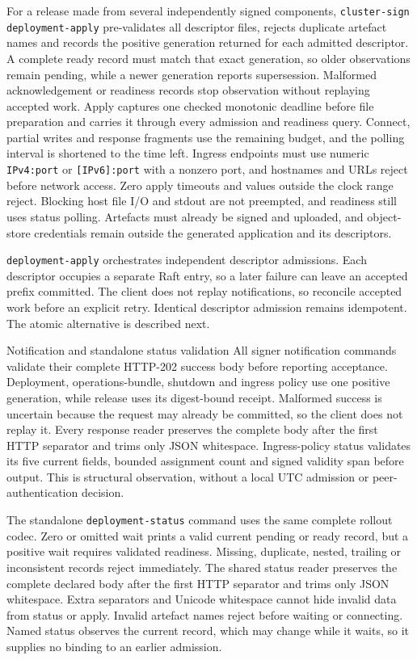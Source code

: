 For a release made from several independently signed components,
\texttt{cluster-sign deployment-apply} pre-validates all descriptor files,
rejects duplicate artefact names and records the positive generation returned
for each admitted descriptor. A complete ready record must match that exact
generation, so older observations remain pending, while a newer generation reports
supersession. Malformed acknowledgement or readiness records stop observation
without replaying accepted work. Apply captures one checked monotonic deadline
before file preparation and carries it through every admission and readiness
query. Connect, partial writes and response fragments use the remaining budget, and
the polling interval is shortened to the time left. Ingress endpoints must use
numeric \texttt{IPv4:port} or \texttt{[IPv6]:port} with a nonzero port, and hostnames
and URLs reject before network access. Zero apply timeouts and values outside the
clock range reject. Blocking host file I/O and stdout are not preempted, and
readiness still uses status polling. Artefacts must already be signed and uploaded, and object-store
credentials remain outside the generated application and its descriptors.

\texttt{deployment-apply} orchestrates independent descriptor admissions.
Each descriptor occupies a separate Raft entry, so a later failure can leave
an accepted prefix committed. The client does not replay notifications, so
reconcile accepted work before an explicit retry. Identical descriptor admission
remains idempotent. The atomic alternative is described next.

\begin{implementationdetail}{Notification and standalone status validation}
All signer notification commands validate their complete HTTP-202 success body
before reporting acceptance. Deployment, operations-bundle, shutdown and ingress
policy use one positive generation, while release uses its digest-bound receipt.
Malformed success is uncertain because the request may already be committed, so
the client does not replay it. Every response reader preserves the complete
body after the first HTTP separator and trims only JSON whitespace.
Ingress-policy status validates its five current fields, bounded assignment
count and signed validity span before output. This is structural observation,
without a local UTC admission or peer-authentication decision.

The standalone \texttt{deployment-status} command uses the same complete rollout
codec. Zero or omitted wait prints a valid current pending or ready record, but
a positive wait requires validated readiness. Missing, duplicate, nested,
trailing or inconsistent records reject immediately. The shared status reader
preserves the complete declared body after the first HTTP separator and trims
only JSON whitespace. Extra separators and Unicode whitespace cannot hide
invalid data from status or apply. Invalid artefact names reject before waiting
or connecting. Named status observes the current record, which may change while
it waits, so it supplies no binding to an earlier admission.
\end{implementationdetail}


